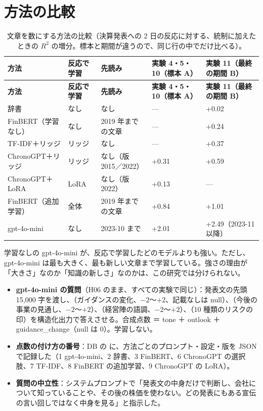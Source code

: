 \section{方法の比較}

\begin{longtable}{P{2.6cm}P{2.8cm}P{2.6cm}P{2.4cm}P{3.6cm}}
\caption{文章を数にする方法の比較（決算発表への 2 日の反応に対する、統制に加えたときの $R^2$ の増分。標本と期間が違うので、同じ行の中でだけ比べる）。}\label{tab:text-compare}\\
\toprule
\textbf{方法} & \textbf{反応で学習} & \textbf{先読み} & \textbf{実験 4・5・10（標本 A）} & \textbf{実験 11（最終の期間 B）} \\
\midrule
\endfirsthead
\toprule
\textbf{方法} & \textbf{反応で学習} & \textbf{先読み} & \textbf{実験 4・5・10（標本 A）} & \textbf{実験 11（最終の期間 B）} \\
\midrule
\endhead
\bottomrule
\endfoot
辞書 & なし & なし & — & +0.02 \\
FinBERT（学習なし） & なし & 2019 年までの文章 & — & +0.24 \\
TF-IDF＋リッジ & リッジ & なし & — & +0.37 \\
ChronoGPT＋リッジ & リッジ & なし（版 2015／2022） & +0.31 & +0.59 \\
ChronoGPT＋LoRA & LoRA & なし（版 2022） & +0.13 & — \\
FinBERT（追加学習） & 全体 & 2019 年までの文章 & +0.84 & +1.01 \\
gpt-4o-mini & なし & 2023-10 まで & +2.01 & +2.49（2023-11 以降） \\
\end{longtable}

学習なしの gpt-4o-mini が、反応で学習したどのモデルよりも強い。ただし、gpt-4o-mini は最も大きく、最も新しい文章まで学習している。強さの理由が「大きさ」なのか「知識の新しさ」なのかは、この研究では分けられない。

\begin{projbox}
\begin{itemize}
\item \textbf{gpt-4o-mini の質問}（H06 のまま、すべての実験で同じ）：発表文の先頭 15,000 字を渡し、（ガイダンスの変化、$-2$〜$+2$、記載なしは null）、（今後の事業の見通し、$-2$〜$+2$）、（経営陣の語調、$-2$〜$+2$）、（10 種類のリスクの印）を構造化出力で答えさせる。合成点数 ＝ tone ＋ outlook ＋ guidance\_change（null は 0）。学習しない。
\item \textbf{点数の付け方の番号}：DB の  に、方法ごとのプロンプト・設定・版を JSON で記録した（1 gpt-4o-mini、2 辞書、3 FinBERT、6 ChronoGPT の選択肢、7 TF-IDF、8 FinBERT の追加学習、9 ChronoGPT の LoRA）。
\item \textbf{質問の中立性}：システムプロンプトで「発表文の中身だけで判断し、会社について知っていることや、その後の株価を使わない。どの発表にもある宣伝の言い回しではなく中身を見る」と指示した。
\end{itemize}
\end{projbox}
